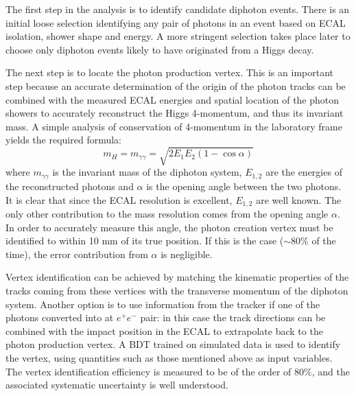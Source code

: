 \documentclass[10pt]{article}
\begin{document}
The first step in the analysis is to identify candidate diphoton events. There is an initial loose selection identifying any pair of photons in an event based on ECAL isolation, shower shape and energy. A more stringent selection takes place later to choose only diphoton events likely to have originated from a Higgs decay.
 
The next step is to locate the photon production vertex. This is an important step because an accurate determination of the origin of the photon tracks can be combined with the measured ECAL energies and spatial location of the photon showers to accurately reconstruct the Higgs 4-momentum, and thus its invariant mass. A simple analysis of conservation of 4-momentum in the laboratory frame yields the required formula:
\begin{equation} m_H=m_{\gamma\gamma}=\sqrt{2E_1 E_2 (1-\cos{\alpha})} \end{equation} where $m_{\gamma\gamma} $ is the invariant mass of the diphoton system, $E_{1,2}$ are the energies of the reconstructed photons and $\alpha$ is the opening angle between the two photons.
It is clear that since the ECAL resolution is excellent, $E_{1,2}$ are well known. The only other contribution to the mass resolution comes from the opening angle $\alpha$. In order to accurately measure this angle, the photon creation vertex must be identified to within 10 mm of its true position. If this is the case ($\sim 80\%$ of the time), the error contribution from $\alpha$ is negligible.

Vertex identification can be achieved by matching the kinematic properties of the tracks coming from these vertices with the transverse momentum of the diphoton system. Another option is to use information from the tracker if one of the photons converted into at $e^+ e^-$ pair: in this case the track directions can be combined with the impact position in the ECAL to extrapolate back to the photon production vertex. A BDT trained on simulated data is used to identify the vertex, using quantities such as those mentioned above as input variables. The vertex identification efficiency is measured to be of the order of 80$\%$, and the associated systematic uncertainty is well understood. 
\end{document}
